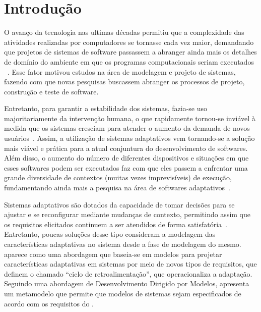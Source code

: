 
\chapter{Introdução}
\label{sec-intro}

O avanço da tecnologia nas ultimas décadas permitiu que a complexidade das atividades realizadas por computadores se tornasse cada vez maior, demandando que projetos de sistemas de software passassem a abranger ainda mais os detalhes de domínio do ambiente em que os programas computacionais seriam executados ~\cite{andersson2009modeling,brun2009engineering}. Esse fator motivou estudos na área de modelagem e projeto de sistemas, fazendo com que novas pesquisas buscassem abranger os processos de projeto, construção e teste de software. 

Entretanto, para garantir a estabilidade dos sistemas, fazia-se uso majoritariamente da intervenção humana, o que rapidamente tornou-se inviável à medida que os sistemas cresciam para atender o aumento da demanda de novos usuários~\cite{andersson2009modeling}. Assim, a utilização de sistemas adaptativos vem tornando-se a solução mais viável e prática para a atual conjuntura do desenvolvimento de softwares. Além disso, o aumento do número de diferentes dispositivos e situações em que esses softwares podem ser executados faz com que eles passem a enfrentar uma grande diversidade de contextos (muitas vezes imprevisíveis) de execução, fundamentando ainda mais a pesquisa na área de softwares adaptativos~\cite{kephart2003vision}.

Sistemas adaptativos são dotados da capacidade de tomar decisões para se ajustar e se reconfigurar mediante mudanças de contexto, permitindo assim que os requisitos elicitados continuem a ser atendidos de forma satisfatória~\cite{souza2012requirement}. Entretanto, poucas soluções desse tipo consideram a modelagem das características adaptativas no sistema desde a fase de modelagem do mesmo. \zanshin~\cite{tesevitor} aparece como uma abordagem que baseia-se em modelos para projetar características adaptativas em sistemas por meio de novos tipos de requisitos, que definem o chamado ``ciclo de retroalimentação'', que operacionaliza a adaptação. Seguindo uma abordagem de Desenvolvimento Dirigido por Modelos, \zanshin apresenta um metamodelo que permite que modelos de sistemas sejam especificados de acordo com os requisitos do \framework.

